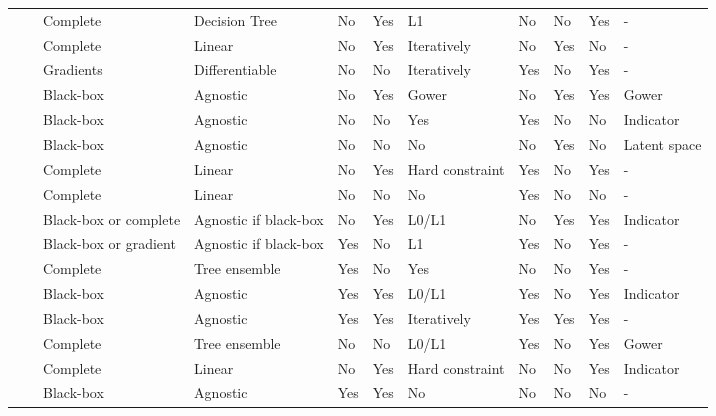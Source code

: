 \begin{table*}
{\begin{tabular}{m{}m{}m{}m{}m{}m{}m{}m{}m{}m{}m{}}
    & \citep{oblique-tree-cfe,oblique-tree-cfe-copy} & Complete & Decision Tree & No & Yes & L1 & No & No & Yes & - \\ %
    & \citep{Ordered-CFE-Kanamori} & Complete & Linear & No & Yes & Iteratively & No & Yes & No & - \\  %
    & \citep{Epistemic_and_Aleatoric_uncertainty} & Gradients & Differentiable & No & No & Iteratively & Yes & No & Yes & -  \\ %
    & \citep{naumann2021consequenceaware} & Black-box & Agnostic & No & Yes & Gower & No & Yes & Yes & Gower \\  %
    & \citep{nice_cfe} & Black-box & Agnostic & No & No & Yes & Yes & No & No & Indicator \\ %
    & \citep{prototype_based_cfe} & Black-box & Agnostic & No & No & No & No & Yes & No & Latent space \\ %
    & \citep{CFE-scorecard} & Complete & Linear & No & Yes & Hard \mbox{constraint} & Yes & No & Yes & - \\ %
    & \citep{convex_optimization_cfe} & Complete & Linear & No & No & No & Yes & No & No & - \\ %
    & \citep{schleich2021geco} & Black-box or complete & Agnostic if black-box & No & Yes & L0/L1 & No & Yes & Yes & Indicator \\ %
    & \citep{nemirovsky-hired-people-cfe-countergan} & Black-box or gradient & Agnostic if black-box & Yes & No & L1 & Yes & No & Yes & - \\ %
    & \citep{Pierre-tree-ensemble-pure-region} & Complete & Tree ensemble & Yes & No & Yes & No & No & Yes & - \\ %
    & \citep{rl_cfe_approach2_amortized} & Black-box & Agnostic & Yes & Yes & L0/L1 & Yes & No & Yes & Indicator \\ %
    & \citep{verma2021amortized} & Black-box & Agnostic & Yes & Yes & Iteratively & Yes & Yes & Yes & - \\ %
    & \citep{CFE-Tree-ensembles} & Complete & Tree ensemble & No & No & L0/L1 & Yes & No & Yes & Gower \\ %
    & \citep{scaling_Nearest_CFE} & Complete & Linear & No & Yes & Hard \mbox{constraint} & No & No & Yes & Indicator \\ %
    & \citep{Fraunhofer-pure-region-sampling} & Black-box & Agnostic & Yes & Yes & No & No & No & No & - \\ %

\end{tabular}}
\end{table*}
